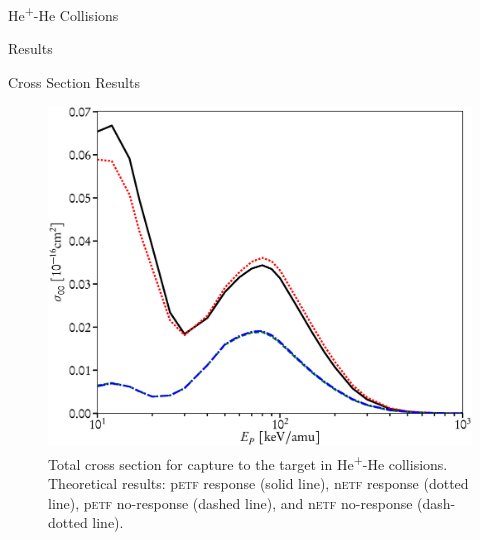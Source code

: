 \documentclass[a5paper, 9 pt]{extreport}
\begin{document}
\begin{chapter}{\texorpdfstring{He\textsuperscript{+}}{He+}-He Collisions \label{chap:hephe}}
\begin{section}{Results \label{sec:hephe-disc}}
\begin{subsection}{Cross Section Results \label{sec:hephe-res}}
         \begin{figure}[t]
            \begin{minipage}{.49\linewidth}
               \centering
               \includegraphics[width = \linewidth]{./images/hephe-cross/HepHe-300.eps}
               \caption[Total cross section for capture to the target in He\textsuperscript{+}-He
                        collisions.]
                       {Total cross section for capture to the target in He\textsuperscript{+}-He
                        collisions.
                        Theoretical results: p\textsc{etf} response (solid line), n\textsc{etf} response
                                             (dotted line), p\textsc{etf} no-response (dashed line), and
                                             n\textsc{etf} no-response (dash-dotted line).
                        \label{fig:cs300}}
            \end{minipage} \hspace{0.009\linewidth} %
            \begin{minipage}{.49\linewidth}
               \centering

\end{minipage}
\end{figure}
\end{subsection}
\end{section}
\end{chapter}
\end{document}
